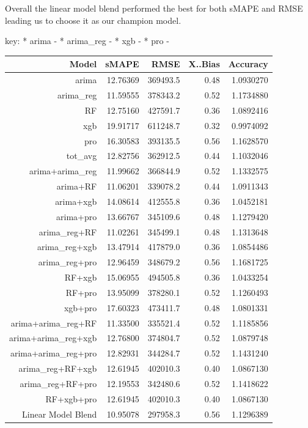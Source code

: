 \documentclass[12pt,oneside]{chicagocapstone}
\begin{document}
Overall the linear model blend performed the best for both sMAPE and
RMSE leading us to choose it as our champion model.

key: * arima - * arima\_reg - * xgb - * pro -
\begin{longtable}[]{@{}rrrrr@{}}
\toprule
Model & sMAPE & RMSE & X..Bias & Accuracy\tabularnewline
\midrule
\endhead
arima & 12.76369 & 369493.5 & 0.48 & 1.0930270\tabularnewline
arima\_reg & 11.59555 & 378343.2 & 0.52 & 1.1734880\tabularnewline
RF & 12.75160 & 427591.7 & 0.36 & 1.0892416\tabularnewline
xgb & 19.91717 & 611248.7 & 0.32 & 0.9974092\tabularnewline
pro & 16.30583 & 393135.5 & 0.56 & 1.1628570\tabularnewline
tot\_avg & 12.82756 & 362912.5 & 0.44 & 1.1032046\tabularnewline
arima+arima\_reg & 11.99662 & 366844.9 & 0.52 & 1.1332575\tabularnewline
arima+RF & 11.06201 & 339078.2 & 0.44 & 1.0911343\tabularnewline
arima+xgb & 14.08614 & 412555.8 & 0.36 & 1.0452181\tabularnewline
arima+pro & 13.66767 & 345109.6 & 0.48 & 1.1279420\tabularnewline
arima\_reg+RF & 11.02261 & 345499.1 & 0.48 & 1.1313648\tabularnewline
arima\_reg+xgb & 13.47914 & 417879.0 & 0.36 & 1.0854486\tabularnewline
arima\_reg+pro & 12.96459 & 348679.2 & 0.56 & 1.1681725\tabularnewline
RF+xgb & 15.06955 & 494505.8 & 0.36 & 1.0433254\tabularnewline
RF+pro & 13.95099 & 378280.1 & 0.52 & 1.1260493\tabularnewline
xgb+pro & 17.60323 & 473411.7 & 0.48 & 1.0801331\tabularnewline
arima+arima\_reg+RF & 11.33500 & 335521.4 & 0.52 &
1.1185856\tabularnewline
arima+arima\_reg+xgb & 12.76800 & 374804.7 & 0.52 &
1.0879748\tabularnewline
arima+arima\_reg+pro & 12.82931 & 344284.7 & 0.52 &
1.1431240\tabularnewline
arima\_reg+RF+xgb & 12.61945 & 402010.3 & 0.40 &
1.0867130\tabularnewline
arima\_reg+RF+pro & 12.19553 & 342480.6 & 0.52 &
1.1418622\tabularnewline
RF+xgb+pro & 12.61945 & 402010.3 & 0.40 & 1.0867130\tabularnewline
Linear Model Blend & 10.95078 & 297958.3 & 0.56 &
1.1296389\tabularnewline
\bottomrule
\end{longtable}
\end{document}

